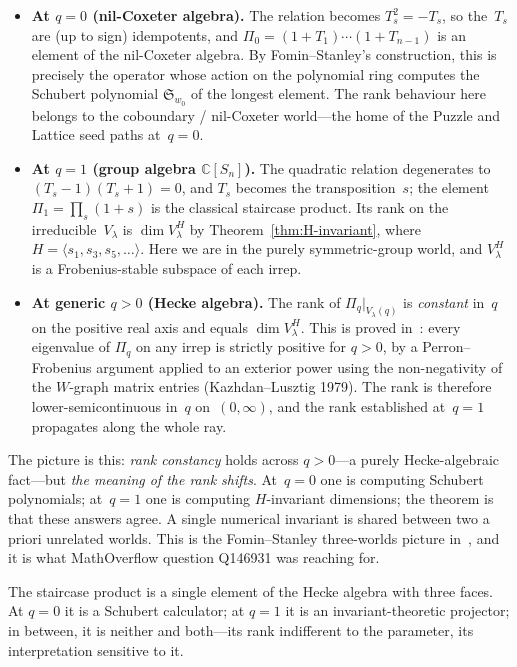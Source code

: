 \begin{itemize}
\item \textbf{At $q = 0$ (nil-Coxeter algebra).}  The relation becomes
  $T_s^2 = -T_s$, so the~$T_s$ are (up to sign) idempotents, and
  $\Pi_0 = (1+T_1)\cdots(1+T_{n-1})$ is an element of the nil-Coxeter
  algebra.  By Fomin--Stanley's construction, this is precisely the
  operator whose action on the polynomial ring computes the Schubert
  polynomial $\mathfrak{S}_{w_0}$ of the longest element.  The rank
  behaviour here belongs to the coboundary / nil-Coxeter world---the
  home of the Puzzle and Lattice seed paths at~$q = 0$.

\item \textbf{At $q = 1$ (group algebra $\mathbb{C}[S_n]$).}  The
  quadratic relation degenerates to $(T_s - 1)(T_s + 1) = 0$, and
  $T_s$ becomes the transposition~$s$; the element
  $\Pi_1 = \prod_s (1 + s)$ is the classical staircase product.  Its
  rank on the irreducible~$V_\lambda$ is $\dim V_\lambda^H$ by
  Theorem~\ref{thm:H-invariant}, where
  $H = \langle s_1, s_3, s_5, \ldots\rangle$.  Here we are in the
  purely symmetric-group world, and $V_\lambda^H$ is a
  Frobenius-stable subspace of each irrep.

\item \textbf{At generic $q > 0$ (Hecke algebra).}  The rank of
  $\Pi_q|_{V_\lambda(q)}$ is \emph{constant} in~$q$ on the positive
  real axis and equals $\dim V_\lambda^H$.  This is proved
  in~\cite{clio-eigenvalue-positivity-2026}: every eigenvalue of
  $\Pi_q$ on any irrep is strictly positive for $q > 0$, by a
  Perron--Frobenius argument applied to an exterior power using the
  non-negativity of the $W$-graph matrix entries
  (Kazhdan--Lusztig 1979).  The rank is therefore lower-semicontinuous
  in~$q$ on~$(0, \infty)$, and the rank established at~$q = 1$
  propagates along the whole ray.
\end{itemize}

The picture is this: \emph{rank constancy} holds across $q > 0$---a
purely Hecke-algebraic fact---but \emph{the meaning of the rank
shifts}.  At~$q = 0$ one is computing Schubert polynomials; at~$q = 1$
one is computing $H$-invariant dimensions; the theorem is that these
answers agree.  A single numerical invariant is shared between two
a priori unrelated worlds.  This is the Fomin--Stanley three-worlds
picture in~\cite{clio-h-invariant-2026}, and it is what
MathOverflow question Q146931 was reaching for.

\begin{remark}
\label{rem:three-faces}
The staircase product is a single element of the Hecke algebra with
three faces.  At $q = 0$ it is a Schubert calculator; at $q = 1$ it
is an invariant-theoretic projector; in between, it is neither and
both---its rank indifferent to the parameter, its interpretation
sensitive to it.
\end{remark}

